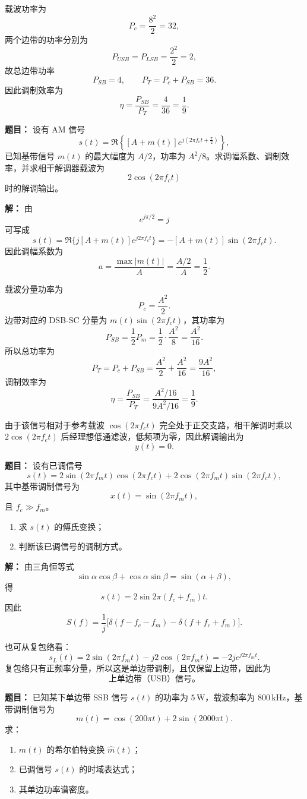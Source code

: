 载波功率为
\[
P_c=\frac{8^2}{2}=32,
\]
两个边带的功率分别为
\[
P_{USB}=P_{LSB}=\frac{2^2}{2}=2,
\]
故总边带功率
\[
P_{SB}=4,
\qquad
P_T=P_c+P_{SB}=36.
\]
因此调制效率为
\[
\eta=\frac{P_{SB}}{P_T}=\frac{4}{36}=\frac{1}{9}.
\]

\medskip
{}
\textbf{题目：}
设有 AM 信号
\[
s(t)=\Re\left\{[A+m(t)]e^{j\left(2\pi f_c t+\frac{\pi}{2}\right)}\right\},
\]
已知基带信号 $m(t)$ 的最大幅度为 $A/2$，功率为 $A^2/8$。求调幅系数、调制效率，并求相干解调器载波为
\[
2\cos(2\pi f_c t)
\]
时的解调输出。

\par\textbf{解：}
由
\[
e^{j\pi/2}=j
\]
可写成
\[
s(t)=\Re\{j[A+m(t)]e^{j2\pi f_ct}\}= -[A+m(t)]\sin(2\pi f_ct).
\]
因此调幅系数为
\[
a=\frac{\max|m(t)|}{A}=\frac{A/2}{A}=\frac12.
\]

载波分量功率为
\[
P_c=\frac{A^2}{2}.
\]
边带对应的 DSB-SC 分量为 $m(t)\sin(2\pi f_ct)$，其功率为
\[
P_{SB}=\frac{1}{2}P_m=\frac12\cdot \frac{A^2}{8}=\frac{A^2}{16}.
\]
所以总功率为
\[
P_T=P_c+P_{SB}=\frac{A^2}{2}+\frac{A^2}{16}=\frac{9A^2}{16},
\]
调制效率为
\[
\eta=\frac{P_{SB}}{P_T}=\frac{A^2/16}{9A^2/16}=\frac19.
\]

由于该信号相对于参考载波 $\cos(2\pi f_ct)$ 完全处于正交支路，相干解调时乘以 $2\cos(2\pi f_ct)$ 后经理想低通滤波，低频项为零，因此解调输出为
\[
y(t)=0.
\]

\medskip
{}
\textbf{题目：}
设有已调信号
\[
s(t)=2\sin(2\pi f_m t)\cos(2\pi f_c t)+2\cos(2\pi f_m t)\sin(2\pi f_c t),
\]
其中基带调制信号为
\[
x(t)=\sin(2\pi f_m t),
\]
且 $f_c\gg f_m$。

\begin{enumerate}
\item 求 $s(t)$ 的傅氏变换；
\item 判断该已调信号的调制方式。
\end{enumerate}

\par\textbf{解：}
由三角恒等式
\[
\sin\alpha\cos\beta+\cos\alpha\sin\beta=\sin(\alpha+\beta),
\]
得
\[
s(t)=2\sin 2\pi(f_c+f_m)t.
\]
因此
\[
S(f)=\frac{1}{j}\bigl[\delta(f-f_c-f_m)-\delta(f+f_c+f_m)\bigr].
\]

也可从复包络看：
\[
s_L(t)=2\sin(2\pi f_m t)-j2\cos(2\pi f_m t)
=-2je^{j2\pi f_m t}.
\]
复包络只有正频率分量，所以这是单边带调制，且仅保留上边带，因此为
\[
\text{上单边带（USB）信号。}
\]

\medskip
{}
\textbf{题目：}
已知某下单边带 SSB 信号 $s(t)$ 的功率为 $5\,\mathrm{W}$，载波频率为 $800\,\mathrm{kHz}$，基带调制信号为
\[
m(t)=\cos(200\pi t)+2\sin(2000\pi t).
\]
求：
\begin{enumerate}
\item $m(t)$ 的希尔伯特变换 $\hat m(t)$；
\item 已调信号 $s(t)$ 的时域表达式；
\item 其单边功率谱密度。
\end{enumerate}


